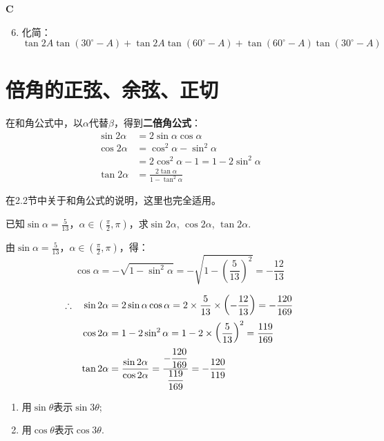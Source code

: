 \begin{center}
    \bfseries C
\end{center}

\begin{enumerate}\setcounter{enumi}{5}
    \item 化简：$$\tan2A \tan(30^{\circ}-A)+ \tan2A \tan(60^{\circ}-A) +\tan\left(60^{\circ}-A\right)\tan \left(30^{\circ}-A\right)$$
\end{enumerate}

\section{倍角的正弦、余弦、正切}
在和角公式中，以$\alpha$代替$\beta$，得到\textbf{二倍角公式}：
\begin{align}
\sin2\alpha&=2\sin\alpha\cos\alpha \nonumber\\
\cos2\alpha&=\cos^2\alpha-\sin^2\alpha\nonumber\\
&=2\cos^2\alpha-1=1-2\sin^2\alpha \tag{$\sin^2\alpha=1-\cos^2\alpha$}\\
\tan2\alpha&=\frac{2\tan\alpha}{1-\tan^2\alpha}    \nonumber
\end{align}

在2.2节中关于和角公式的说明，这里也完全适用。

\begin{example}
已知$\sin\alpha=\frac{5}{13}$，$\alpha\in\left(\frac{\pi}{2},\pi\right)$，求$\sin2\alpha$, $\cos2\alpha$, $\tan2\alpha$. 
\end{example}

\begin{solution}
    由$\sin\alpha=\frac{5}{13}$，$\alpha\in\left(\frac{\pi}{2},\pi\right)$，得：
\[\cos\alpha=-\sqrt{1-\sin^2\alpha}=-\sqrt{1-\left(\frac{5}{13}\right)^2}=-\frac{12}{13}\]

\[\begin{split}
\therefore\quad \sin2\alpha&=2\sin\alpha\cos\alpha=2\times\dfrac{5}{13}\times\left(-\dfrac{12}{13}\right)=-\dfrac{120}{169}    \\
\cos2\alpha&=1-2\sin^2\alpha =1-2\times\left(\dfrac{5}{13}\right)^2=\dfrac{119}{169}\\
\tan2\alpha&=\dfrac{\sin2\alpha}{\cos2\alpha}=\dfrac{-\dfrac{120}{169}}{\dfrac{119}{169}}=-\dfrac{120}{119}
\end{split}\]
\end{solution}


\begin{example}
\begin{enumerate}[(1)]
    \item 用$\sin\theta$表示$\sin3\theta$;
    \item 用$\cos\theta$表示$\cos3\theta$.
\end{enumerate}
\end{example}

